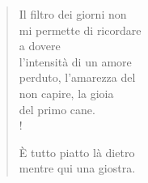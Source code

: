 
\begin{verse}
    Il filtro dei giorni non\\
    mi permette di ricordare\\
    a dovere\\
    l'intensità di un amore\\
    perduto, l'amarezza del\\
    non capire, la gioia\\
    del primo cane.\\!
    
    È tutto piatto là dietro\\
    mentre qui una giostra.


\end{verse}